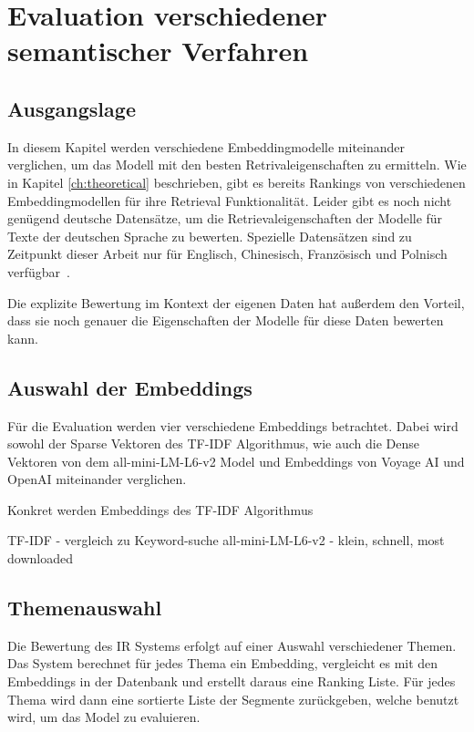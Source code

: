 \chapter{Evaluation verschiedener semantischer Verfahren}\label{ch:experiments}

\section{Ausgangslage}

In diesem Kapitel werden verschiedene Embeddingmodelle miteinander verglichen, um das Modell mit den besten Retrivaleigenschaften zu ermitteln.
Wie in Kapitel \autoref*{ch:theoretical} beschrieben, gibt es bereits Rankings von verschiedenen Embeddingmodellen für ihre Retrieval Funktionalität.
Leider gibt es noch nicht genügend deutsche Datensätze, um die Retrievaleigenschaften der Modelle für Texte der deutschen Sprache zu bewerten.
Spezielle Datensätzen sind zu Zeitpunkt dieser Arbeit nur für Englisch, Chinesisch, Französisch und Polnisch verfügbar~\cite{mteb}.

Die explizite Bewertung im Kontext der eigenen Daten hat außerdem den Vorteil, dass sie noch genauer die Eigenschaften der Modelle für diese Daten bewerten kann.


\section{Auswahl der Embeddings}

Für die Evaluation werden vier verschiedene Embeddings betrachtet.
Dabei wird sowohl der Sparse Vektoren des TF-IDF Algorithmus, wie auch die Dense Vektoren von dem all-mini-LM-L6-v2 Model und Embeddings von Voyage AI und OpenAI miteinander verglichen.

Konkret werden Embeddings des TF-IDF Algorithmus

TF-IDF - vergleich zu Keyword-suche
all-mini-LM-L6-v2 - klein, schnell, most downloaded~\cite{2024}


\section{Themenauswahl}

Die Bewertung des IR Systems erfolgt auf einer Auswahl verschiedener Themen.
Das System berechnet für jedes Thema ein Embedding, vergleicht es mit den Embeddings in der Datenbank und erstellt daraus eine Ranking Liste.
Für jedes Thema wird dann eine sortierte Liste der Segmente zurückgeben, welche benutzt wird, um das Model zu evaluieren.

